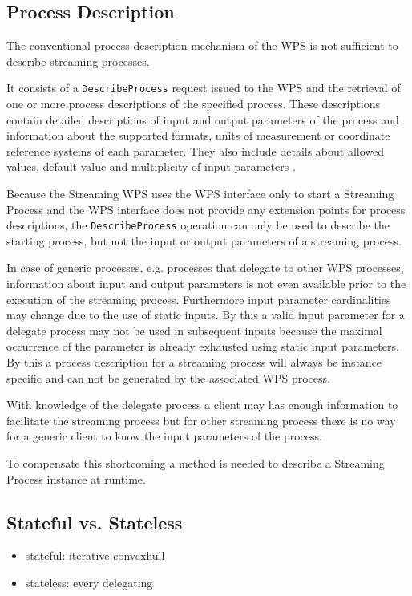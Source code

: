 	\subsection{Process Description}
		\label{sec:stream:processdescription}
		The conventional process description mechanism of the \ac{WPS} is not sufficient to describe streaming processes.

		It consists of a \texttt{DescribeProcess} request issued to the \ac{WPS} and the retrieval of one or more process descriptions of the specified process. These descriptions contain detailed descriptions of input and output parameters of the process and information about the supported formats, units of measurement or coordinate reference systems of each parameter. They also include details about allowed values, default value and multiplicity of input parameters \citep{ogc:wps}.

		Because the Streaming \ac{WPS} uses the \ac{WPS} interface only to start a Streaming Process and the \ac{WPS} interface does not provide any extension points for process descriptions, the \texttt{DescribeProcess} operation can only be used to describe the starting process, but not the input or output parameters of a streaming process.

		In case of generic processes, e.g. processes that delegate to other \ac{WPS} processes, information about input and output parameters is not even available prior to the execution of the streaming process. Furthermore input parameter cardinalities may change due to the use of static inputs. By this a valid input parameter for a delegate process may not be used in subsequent inputs because the maximal occurrence of the parameter is already exhausted using static input parameters. By this a process description for a streaming process will always be instance specific and can not be generated by the associated \ac{WPS} process.

		With knowledge of the delegate process a client may has enough information to facilitate the streaming process but for other streaming process there is no way for a generic client to know the input parameters of the process.

		To compensate this shortcoming a method is needed to describe a Streaming Process instance at runtime.
	\subsection{Stateful vs. Stateless}
	\begin{itemize}
		\item stateful: iterative convexhull
		\item stateless: every delegating
	\end{itemize}

